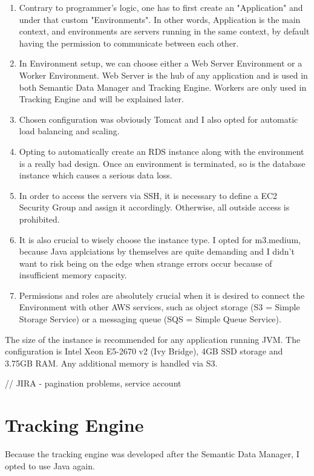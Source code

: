 \begin{enumerate}
	\item Contrary to programmer's logic, one has to first create an "Application" and under that custom "Environments". In other words, Application is the main context, and environments are servers running in the same context, by default having the permission to communicate between each other.
	\item In Environment setup, we can choose either a Web Server Environment or a Worker Environment. Web Server is the hub of any application and is used in both Semantic Data Manager and Tracking Engine. Workers are only used in Tracking Engine and will be explained later.
	\item Chosen configuration was obviously Tomcat and I also opted for automatic load balancing and scaling.
	\item Opting to automatically create an RDS instance along with the environment is a really bad design. Once an environment is terminated, so is the database instance which causes a serious data loss.
	\item In order to access the servers via SSH, it is necessary to define a EC2 Security Group and assign it accordingly. Otherwise, all outside access is prohibited.
	\item It is also crucial to wisely choose the instance type. I opted for m3.medium, because Java applciations by themselves are quite demanding and I didn't want to risk being on the edge when strange errors occur because of insufficient memory capacity.
	\item Permissions and roles are absolutely crucial when it is desired to connect the Environment with other AWS services, such as object storage (S3 = Simple Storage Service) or a messaging queue (SQS = Simple Queue Service).
\end{enumerate}

 The size of the instance is recommended for any application running JVM. The configuration is Intel Xeon E5-2670 v2 (Ivy Bridge), 4GB SSD storage and 3.75GB RAM. Any additional memory is handled via S3.

// JIRA - pagination problems, service account

\section{Tracking Engine}

Because the tracking engine was developed after the Semantic Data Manager, I opted to use Java again. 

